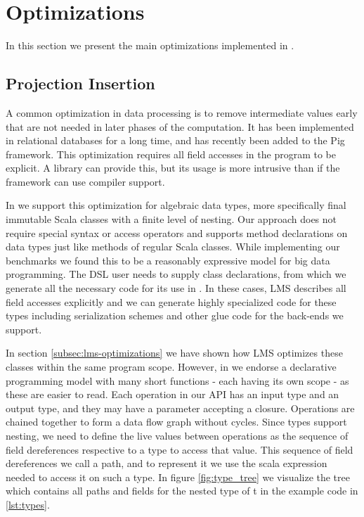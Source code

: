 \section{Optimizations}
\label{sec:optimizations}
In this section we present the main optimizations implemented in \tool.
\subsection{Projection Insertion}
\label{sec:field-reduction}

A common optimization in data processing is to remove intermediate values early that are not needed in later phases of the computation. It has been implemented in relational databases for a long time, and has recently been added to the Pig framework. This optimization requires all field accesses in the program to be explicit. A library can provide this, but its usage is more intrusive than if the framework can use compiler support. 

In \tool we support this optimization for algebraic data types, more specifically final immutable Scala classes with a finite level of nesting. Our approach does not require special syntax or access operators and supports method declarations on data types just like methods of regular Scala classes. While implementing our benchmarks we found this to be a reasonably expressive model for big data programming. The DSL user needs to supply class declarations, from which we generate all the necessary code for its use in \tool. In these cases, LMS describes all field accesses explicitly and we can generate highly specialized code for these types including serialization schemes and other glue code for the back-ends we support.



In section \ref{subsec:lms-optimizations} we have shown how LMS optimizes these classes within the same program scope. However, in \tool we endorse a declarative programming model with many short functions - each having its own scope - as these are easier to read. Each operation in our API has an input type and an output type, and they may have a parameter accepting a closure. Operations are chained together to form a data flow graph without cycles. Since types support nesting, we need to define the live values between operations as the sequence of field dereferences respective to a type to access that value. This sequence of field dereferences we call a path, and to represent it we use the scala expression needed to access it on such a type. In figure \ref{fig:type_tree} we visualize the tree which contains all paths and fields for the nested type of t in the example code in \ref{lst:types}.

